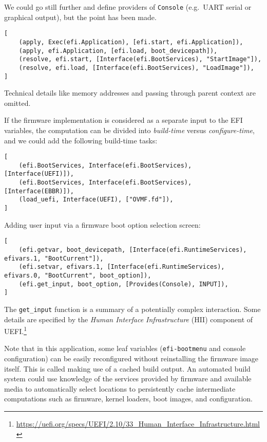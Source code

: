 We could go still further and define providers of \texttt{Console} (e.g.~UART serial or graphical output), but the point has been made.

\begin{verbatim}
[
    (apply, Exec(efi.Application), [efi.start, efi.Application]),
    (apply, efi.Application, [efi.load, boot_devicepath]),
    (resolve, efi.start, [Interface(efi.BootServices), "StartImage"]),
    (resolve, efi.load, [Interface(efi.BootServices), "LoadImage"]),
]
\end{verbatim}
Technical details like memory addresses and passing through parent context are omitted.

%
If the firmware implementation is considered as a separate input to the EFI variables, the computation can be divided into \emph{build-time} versus \emph{configure-time}, and we could add the following build-time tasks:
\begin{verbatim}
[
    (efi.BootServices, Interface(efi.BootServices), [Interface(UEFI)]),
    (efi.BootServices, Interface(efi.BootServices), [Interface(EBBR)]),
    (load_uefi, Interface(UEFI), ["OVMF.fd"]),
]
\end{verbatim}

Adding user input via a firmware boot option selection screen:
\begin{verbatim}
[
    (efi.getvar, boot_devicepath, [Interface(efi.RuntimeServices), efivars.1, "BootCurrent"]),
    (efi.setvar, efivars.1, [Interface(efi.RuntimeServices), efivars.0, "BootCurrent", boot_option]),
    (efi.get_input, boot_option, [Provides(Console), INPUT]),
]
\end{verbatim}
The \texttt{get\_input} function is a summary of a potentially complex interaction.
%
Some details are specified by the \emph{Human Interface Infrastructure} (HII) component of UEFI.\footnote{\url{https://uefi.org/specs/UEFI/2.10/33_Human_Interface_Infrastructure.html}}


Note that in this application, some leaf variables (\texttt{efi-bootmenu} and console configuration) can be easily
reconfigured without reinstalling the firmware image itself. 
%
This is called making use of a cached build output.
%
An automated build system could use knowledge of the services provided by firmware and available media to automatically select locations to persistently cache intermediate computations such as firmware, kernel loaders, boot images, and configuration.

